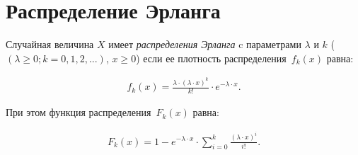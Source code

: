 \chapter{Распределение Эрланга}

Случайная величина $X$ имеет \textit{распределения Эрланга} c параметрами $\lambda$ и $k$ ($(\lambda \geqslant 0; k = 0, 1, 2, ...)$, $x \geqslant 0$) если ее плотность распределения~$f_k(x)$ равна:

\begin{equation}
	\begin{aligned}
		f_k(x) = \frac{\lambda \cdot (\lambda \cdot x)^{k}}{k!} \cdot e^{-\lambda \cdot x}.
	\end{aligned}
\end{equation}

При этом функция распределения~$F_k(x)$ равна:

\begin{equation}
	\begin{aligned}
		F_k(x) = 1 - e^{-\lambda \cdot x} \cdot \sum_{i = 0}^{k} \frac{(\lambda \cdot x)^i}{i!}.
	\end{aligned}
\end{equation}



